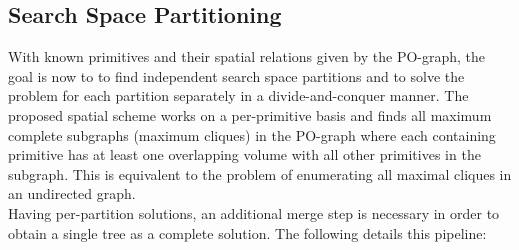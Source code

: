\subsection{Search Space Partitioning}
\label{ch:ssp}
With known primitives and their spatial relations given by the \ac{PO}-graph, the goal is now to to find independent search space partitions and to solve the problem for each partition separately in a divide-and-conquer manner.
The proposed spatial scheme works on a per-primitive basis and finds all maximum complete subgraphs (maximum cliques) in the \ac{PO}-graph where each containing primitive has at least one overlapping volume with all other primitives in the subgraph.
This is equivalent to the problem of enumerating all maximal cliques in an undirected graph.
\\
Having per-partition solutions, an additional merge step is necessary in order to obtain a single tree as a complete solution. 
The following details this pipeline:
